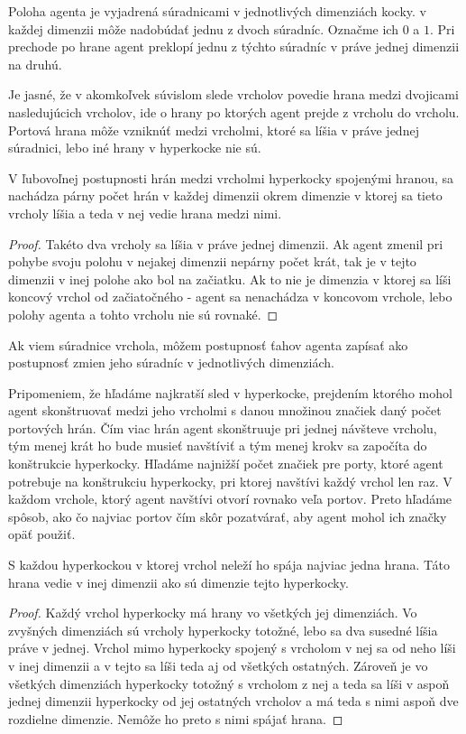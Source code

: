 \begin{ozn}
Poloha agenta je vyjadrená súradnicami v jednotlivých dimenziách kocky. v
každej dimenzii môže nadobúdať jednu z dvoch súradníc. Označme ich $0$ a $1$.
Pri prechode po hrane agent preklopí jednu z týchto súradníc v práve jednej
dimenzii na druhú.
\end{ozn}
Je jasné, že v akomkoľvek súvislom slede vrcholov povedie hrana
medzi dvojicami nasledujúcich vrcholov, ide o hrany po ktorých agent prejde
z vrcholu do vrcholu.
Portová hrana môže vzniknúť medzi vrcholmi, ktoré sa líšia v práve jednej
súradnici, lebo iné hrany v hyperkocke nie sú. 
\begin{lem}
V ľubovoľnej postupnosti hrán medzi vrcholmi hyperkocky spojenými hranou, sa
nachádza párny počet hrán v každej dimenzii okrem dimenzie v ktorej sa tieto
vrcholy líšia a teda v nej vedie hrana medzi nimi.
\end{lem}
\begin{proof}
Takéto dva vrcholy sa líšia v práve jednej dimenzii. Ak agent zmenil pri 
pohybe svoju polohu v nejakej dimenzii nepárny počet 
krát, tak je v tejto dimenzii v inej polohe ako bol na začiatku. Ak to nie je 
dimenzia v ktorej sa líši koncový vrchol od začiatočného - agent sa
nenachádza v koncovom vrchole, lebo polohy agenta a tohto vrcholu nie sú
rovnaké.
\end{proof}

\begin{ozn}
Ak viem súradnice vrchola, môžem postupnosť ťahov agenta zapísať ako postupnosť 
zmien jeho súradníc v jednotlivých dimenziách. 
\end{ozn}


Pripomeniem, že hľadáme najkratší sled v hyperkocke, prejdením ktorého
mohol agent skonštruovať medzi jeho vrcholmi 
s danou množinou značiek daný počet portových hrán. Čím viac hrán agent
skonštruuje pri jednej návšteve vrcholu, tým menej krát ho bude musieť
navštíviť a tým menej krokv sa započíta do konštrukcie hyperkocky.
Hľadáme najnižší počet značiek pre porty, ktoré agent potrebuje na
konštrukciu hyperkocky, pri ktorej navštívi každý vrchol len raz. V každom
vrchole, ktorý agent navštívi otvorí rovnako veľa portov. Preto hľadáme
spôsob, ako čo najviac portov čím skôr pozatvárať, aby agent mohol ich
značky opäť použiť.


\begin{lem}
S každou hyperkockou v ktorej vrchol neleží ho spája najviac jedna hrana.
Táto hrana vedie v inej dimenzii ako sú dimenzie tejto hyperkocky.
\end{lem}
\begin{proof}
Každý vrchol hyperkocky má hrany vo všetkých jej dimenziách. Vo zvyšných
dimenziách sú vrcholy hyperkocky totožné, lebo sa dva susedné líšia práve v
jednej. Vrchol mimo hyperkocky spojený s vrcholom v nej sa od neho líši v
inej dimenzii a v tejto sa líši teda aj od všetkých ostatných. Zároveň je vo
všetkých dimenziách hyperkocky totožný s vrcholom z nej a teda sa líši v
aspoň jednej dimenzii hyperkocky od jej ostatných vrcholov a má teda s nimi
aspoň dve rozdielne dimenzie. Nemôže ho preto s nimi spájať hrana.
\end{proof}

